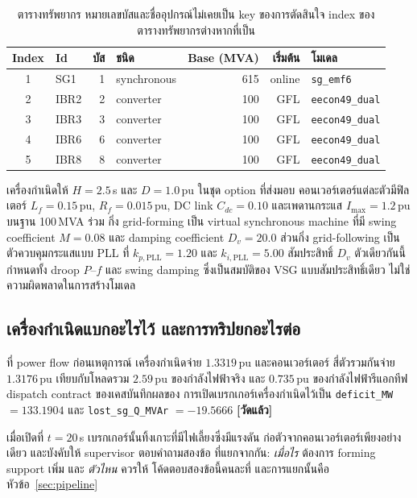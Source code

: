 \documentclass[12pt,a4paper]{article}
\theoremstyle{remark}
\newcommand{\pu}{\,\mathrm{pu}}
\newcommand{\code}[1]{\texttt{\small #1}}
\newcommand{\measured}{\textcolor{ok}{\textbf{[วัดแล้ว]}}}
\begin{document}
\begin{table}[H]
\centering
\small
\begin{tabular}{@{}clrlrrl@{}}
\toprule
\textbf{Index} & \textbf{Id} & \textbf{บัส} & \textbf{ชนิด} & \textbf{Base (MVA)} & \textbf{เริ่มต้น} & \textbf{โมเดล}\\
\midrule
1 & SG1  & 1 & synchronous & 615 & online & \code{sg\_emf6}\\
2 & IBR2 & 2 & converter   & 100 & GFL    & \code{eecon49\_dual}\\
3 & IBR3 & 3 & converter   & 100 & GFL    & \code{eecon49\_dual}\\
4 & IBR6 & 6 & converter   & 100 & GFL    & \code{eecon49\_dual}\\
5 & IBR8 & 8 & converter   & 100 & GFL    & \code{eecon49\_dual}\\
\bottomrule
\end{tabular}
\caption{ตารางทรัพยากร หมายเลขบัสและชื่ออุปกรณ์ไม่เคยเป็น key ของการตัดสินใจ
index ของตารางทรัพยากรต่างหากที่เป็น}
\end{table}

เครื่องกำเนิดให้ $H = 2.5$\,s และ $D = 1.0\pu$ ในชุด option ที่ส่งมอบ
คอนเวอร์เตอร์แต่ละตัวมีฟิลเตอร์ $L_f = 0.15\pu$, $R_f = 0.015\pu$,
DC link $C_{dc} = 0.10$ และเพดานกระแส $I_{\max} = 1.2\pu$ บนฐาน 100\,MVA ร่วม
กิ่ง grid-forming เป็น virtual synchronous machine ที่มี swing coefficient
$M = 0.08$ และ damping coefficient $D_v = 20.0$ ส่วนกิ่ง grid-following เป็น
ตัวควบคุมกระแสแบบ PLL ที่ $k_{p,\mathrm{PLL}} = 1.20$ และ
$k_{i,\mathrm{PLL}} = 5.00$ สัมประสิทธิ์ $D_v$ ตัวเดียวกันนี้กำหนดทั้ง
droop $P$--$f$ และ swing damping ซึ่งเป็นสมบัติของ VSG แบบสัมประสิทธิ์เดียว
ไม่ใช่ความผิดพลาดในการสร้างโมเดล

\subsection{เครื่องกำเนิดแบกอะไรไว้ และการทริปยกอะไรต่อ}

ที่ power flow ก่อนเหตุการณ์ เครื่องกำเนิดจ่าย $1.3319\pu$ และคอนเวอร์เตอร์
สี่ตัวรวมกันจ่าย $1.3176\pu$ เทียบกับโหลดรวม $2.59\pu$ ของกำลังไฟฟ้าจริง
และ $0.735\pu$ ของกำลังไฟฟ้ารีแอกทีฟ dispatch contract ของเคสบันทึกผลของ
การเปิดเบรกเกอร์เครื่องกำเนิดไว้เป็น \code{deficit\_MW} $= 133.1904$ และ
\code{lost\_sg\_Q\_MVAr} $= -19.5666$ \measured

เมื่อเปิดที่ $t = 20$\,s เบรกเกอร์นั้นทิ้งเกาะที่มีไฟเลี้ยงซึ่งมีแรงดัน
ก่อตัวจากคอนเวอร์เตอร์เพียงอย่างเดียว และบังคับให้ supervisor ตอบคำถามสองข้อ
ที่แยกจากกัน: \emph{เมื่อไร} ต้องการ forming support เพิ่ม และ \emph{ตัวไหน}
ควรให้ โค้ดตอบสองข้อนี้คนละที่ และการแยกนั้นคือหัวข้อ~\ref{sec:pipeline}
\end{document}
